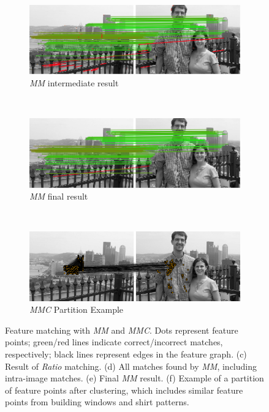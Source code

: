 \begin{figure}[h]
\begin{subfigure}[t]{0.5\columnwidth}
			\includegraphics[width=0.95\columnwidth]{images/mirror_match_with_pruned}
			\caption{\emph{MM} intermediate result}
			\label{fig:within}
		\end{subfigure}%
		\\ %
		\begin{subfigure}[t]{0.5\columnwidth}
			\centering
			\includegraphics[width=0.95\columnwidth]{images/mirror_match}
			\caption{\emph{MM} final result}
			\label{fig:without}
		\end{subfigure}%
		~ %
		\begin{subfigure}[t]{0.5\columnwidth}
			\centering
			\includegraphics[width=0.95\columnwidth]{images/MMC_partition}
			\caption{\emph{MMC} Partition Example}
			\label{fig:pitts_partition}
		\end{subfigure}%
	\caption{Feature matching with \emph{MM} and \emph{MMC}. Dots represent feature points; green/red lines indicate correct/incorrect matches, respectively; black lines represent edges in the feature graph.  
	(c) Result of \emph{Ratio} matching. 
  (d) All matches found by \emph{MM}, including intra-image matches. 
	(e) Final \emph{MM} result. 
	(f) Example of a partition of feature points after clustering, which 
includes similar feature points from building windows and shirt patterns.}%
	\label{fig:comparemirror}%
\end{figure}%

